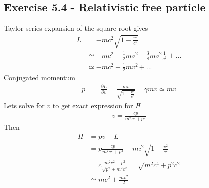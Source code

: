 \documentclass[../main.tex]{subfiles}
\begin{document}
\subsection*{Exercise 5.4 - Relativistic free particle}
Taylor series expansion of the square root gives
\begin{align}
L&=-mc^2\sqrt{1-\frac{v^2}{c^2}}\\
&\simeq -mc^2-\frac{1}{2}mv^2-\frac{3}{8}mv^2\frac{1}{c^2}+...\\
&\simeq -mc^2-\frac{1}{2}mv^2+...
\end{align}
Conjugated momentum
\begin{align}
p&=\frac{\partial L}{\partial v}=\frac{mv}{\sqrt{1-\frac{v^2}{c^2}}}=\gamma mv\simeq mv
\end{align}
Lets solve for $v$ to get exact expression for $H$
\begin{align}
v=\frac{cp}{m^2c^2+p^2}
\end{align}
Then
\begin{align}
H&=pv-L\\
&=p\frac{cp}{m^2c^2+p^2}+mc^2\sqrt{1-\frac{v^2}{c^2}}\\
&=c\frac{m^2c^2+p^2}{\sqrt{p^2+m^2c^2}}=\sqrt{m^2c^4+p^2c^2}\\
&\simeq mc^2+\frac{mv^2}{2}
\end{align}
\end{document}
